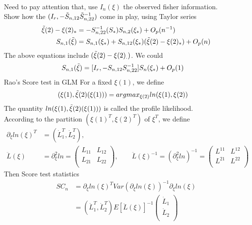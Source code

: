 \documentclass[11pt]{article} %
\begin{document}
	Need to pay attention that, use $I_n(\xi)$ the observed fisher information.\\
	Show how the $(I_r, -\Tilde{S}_{n,12}\Tilde{S}^{-1}_{n,22})$ come in play, using Taylor series
	\begin{align*}
		\Tilde{\xi}(2) - \xi(2)_{\ast} &= - S_{n,22}^{-1}(S_{\ast}) S_{n,2}(\xi_{\ast}) + O_p(n^{-1})\\
		S_{n,1}(\Tilde{\xi}) &= S_{n,1}(\xi_{\ast}) + S_{n,12}(\xi_{\ast}) (\Tilde{\xi}(2) -\xi(2)_{\ast}) + O_p(n) 
	\end{align*} 
	The above equations include $(\Tilde{\xi}(2) -\xi(2)_{.})$. We could 
	\begin{align*}
		S_{n,1}(\Tilde{\xi}) &= [I_r, - S_{n,12} S_{n,22}^{-1}] S_{n}(\xi_{\ast}) + O_p(1)
	\end{align*} 
 Rao's Score test in GLM
	For a fixed $\xi(1)$, we define 
	\begin{align*}
		(\xi(1), \Tilde{\xi}(2)(\xi(1))) &= argmax_{\xi{(2)}} ln(\xi{(1)}, \xi(2))
	\end{align*} 
	The quantity $ln(\xi{(1)},  \Tilde{\xi}(2)(\xi(1)))$ is called the profile likelihood. \\
	According to the partition $(\xi{(1)}^T, \xi(2)^T)$ of $\xi^T$, we define
	\begin{align*}
		\partial_{\xi}ln(\xi)^T &= (\dot{L}_1^T, \dot{L}_2^T),\\
		\ddot{L}(\xi) &= \partial_{\xi}^2 ln = \begin{pmatrix}
			L_{11} & L_{12}\\
			L_{21} & L_{22}\\
		\end{pmatrix} , \qquad \ddot{L}(\xi)^{-1} = (\partial_{\xi}^2 ln)^{-1} =\begin{pmatrix}
			L^{11} & L^{12}\\
			L^{21} & L^{22}\\
		\end{pmatrix} 
	\end{align*} 
	Then Score test statistics
	\begin{align*}
		SC_n &= \partial_{\xi}ln(\xi)^T Var \left(\partial_{\xi}ln(\xi) \right)^{-1} \partial_{\xi}ln(\xi)\\
		&= (\dot{L}_1^T, \dot{L}_2^T) E \left[ \ddot{L}(\xi)\right]^{-1}  \begin{pmatrix}
			\dot{L}_1\\
			\dot{L}_2\\
		\end{pmatrix} 
	\end{align*} 
\end{document}
